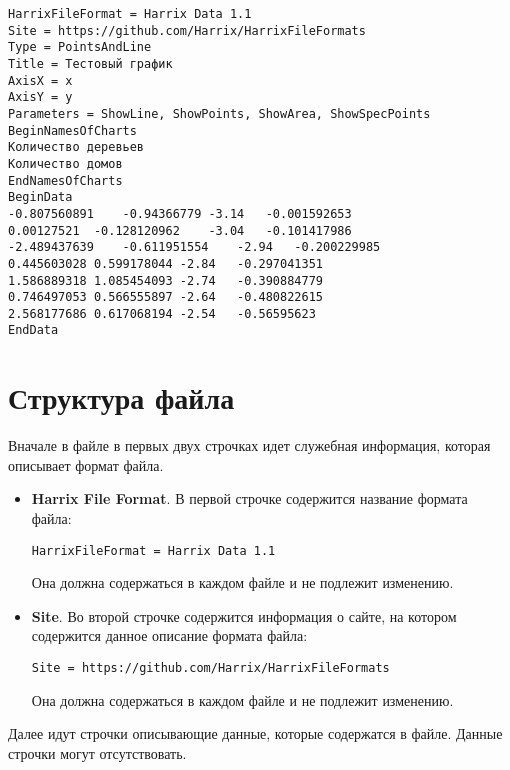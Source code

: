 \documentclass[a4paper,12pt]{article}
\begin{document}
\begin{lstlisting}[label=Example01,caption=Пример файла *.hdata]
HarrixFileFormat = Harrix Data 1.1
Site = https://github.com/Harrix/HarrixFileFormats
Type = PointsAndLine
Title = Тестовый график
AxisX = x
AxisY = y
Parameters = ShowLine, ShowPoints, ShowArea, ShowSpecPoints
BeginNamesOfCharts
Количество деревьев
Количество домов
EndNamesOfCharts
BeginData
-0.807560891	-0.94366779	-3.14	-0.001592653
0.00127521	-0.128120962	-3.04	-0.101417986
-2.489437639	-0.611951554	-2.94	-0.200229985
0.445603028	0.599178044	-2.84	-0.297041351
1.586889318	1.085454093	-2.74	-0.390884779
0.746497053	0.566555897	-2.64	-0.480822615
2.568177686	0.617068194	-2.54	-0.56595623
EndData
\end{lstlisting}

\section{Структура файла}

Вначале в файле в первых двух строчках идет служебная информация, которая описывает формат файла.

\begin{itemize}
\item \textbf{Harrix File Format}.
В первой строчке содержится название формата файла:
\begin{lstlisting}[label=Line01,caption=Первая строчка файла *.hdata]
HarrixFileFormat = Harrix Data 1.1
\end{lstlisting}
Она должна содержаться в каждом файле и не подлежит изменению.

\item \textbf{Site}.
Во второй строчке содержится информация о сайте, на котором содержится данное описание формата файла:
\begin{lstlisting}[label=Line02,caption=Вторая строчка файла *.hdata]
Site = https://github.com/Harrix/HarrixFileFormats
\end{lstlisting}
Она должна содержаться в каждом файле и не подлежит изменению.
\end{itemize}

Далее идут строчки описывающие данные, которые содержатся в файле. Данные строчки могут отсутствовать.
\end{document}
